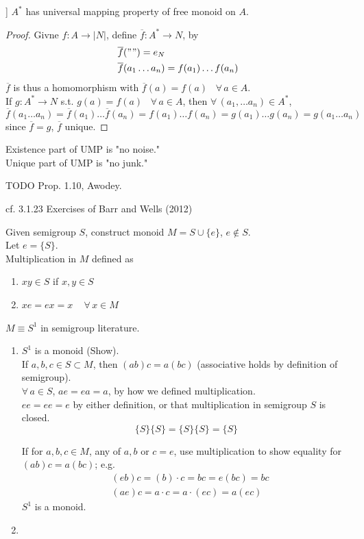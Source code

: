 \begin{proposition}] $A^*$ has universal mapping property of free monoid on $A$.
	\end{proposition} 
\begin{proof}
	Givne $f: A \to |N|$, define $\overline{f} : A^* \to N$, by 
	\[
	\begin{aligned}
	& \overline{f}("") = e_N \\ 
	& \overline{f}(a_1 \dots a_n) = f(a_1) \dots f(a_n) 
	\end{aligned}
	\]	
	$\overline{f}$ is thus a homomorphism with $\overline{f}(a) = f(a)$ \quad \, $\forall \, a \in A$. \\
	
	If $g: A^* \to N$ s.t. $g(a) =f(a)$ \quad \, $\forall \, a \in A$, then $\forall \, (a_1, \dots a_n) \in A^*$, 
	\[
	\overline{f}(a_1 \dots a_n) = \overline{f}(a_1) \dots \overline{f}(a_n) = f(a_1) \dots f(a_n) = g(a_1) \dots g(a_n) = g(a_1 \dots a_n)
	\]
	since $\overline{f} = g$, $\overline{f}$ unique.
\end{proof} 

Existence part of UMP is "no noise." \\
Unique part of UMP is "no junk."

TODO Prop. 1.10, Awodey.






 cf. 3.1.23 Exercises of Barr and Wells (2012) \cite{agat:BaWe2012}

Given semigroup $S$, construct monoid $M = S \cup \lbrace e \rbrace$, $e\notin S$. \\
Let $e=\lbrace S \rbrace$. \\
Multiplication in $M$ defined as 
\begin{enumerate}
	\item $xy \in S$ if $x,y \in S$ 
	\item $xe=ex = x \quad \, \forall \, x \in M$
\end{enumerate}
$M \equiv S^1$ in semigroup literature.

\begin{enumerate}
	\item $S^1$ is a monoid (Show). \\
	If $a,b,c \in S \subset M$, then $(ab)c = a(bc)$ (associative holds by definition of semigroup). \\
	$\forall \, a \in S$, $ae = ea =a$, by how we defined multiplication. \\
	$ee = ee =e $ by either definition, or that multiplication in semigroup $S$ is closed.
	\[
	\lbrace S \rbrace \lbrace S \rbrace = \lbrace S \rbrace \lbrace S \rbrace = \lbrace S \rbrace
	\]
	
	If for $a,b,c \in M$, any of $a,b$ or $c=e$, use multiplication to show equality for $(ab)c = a(bc)$; e.g.
	\[
	\begin{aligned}
	& (eb) c = (b)\cdot c = bc = e(bc) = bc \\ 
	& (ae) c = a\cdot c =a \cdot (ec) = a(ec)
	\end{aligned}
	\]
	$S^1$ is a monoid.
	\item 
\end{enumerate}

